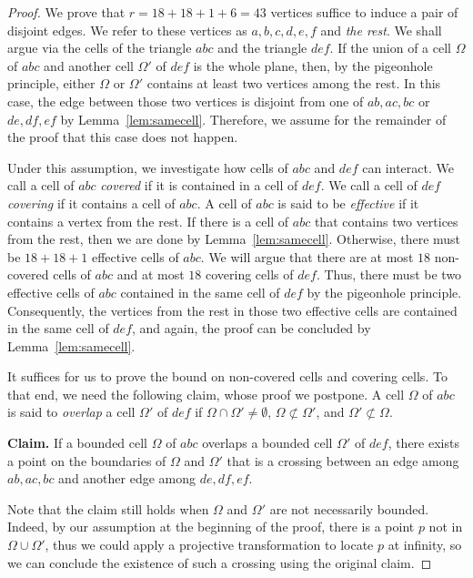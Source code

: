 \documentclass[a4paper,UKenglish,cleveref, autoref, thm-restate]{lipics_arxiv}
\begin{document}
\begin{proof}
We prove that $r = 18 + 18 + 1 + 6 = 43$ vertices suffice to induce a pair of disjoint edges. We refer to these vertices as $a,b,c,d,e,f$ and \textit{the rest}. We shall argue via the cells of the triangle $abc$ and the triangle $def$. If the union of a cell $\Omega$ of $abc$ and another cell $\Omega'$ of $def$ is the whole plane, then, by the pigeonhole principle, either $\Omega$ or $\Omega'$ contains at least two vertices among the rest. In this case, the edge between those two vertices is disjoint from one of $ab,ac,bc$ or $de,df,ef$ by Lemma~\ref{lem:samecell}. Therefore, we assume for the remainder of the proof that this case does not happen.

Under this assumption, we investigate how cells of $abc$ and $def$ can interact. We call a cell of $abc$ \textit{covered} if it is contained in a cell of $def$. We call a cell of $def$ \textit{covering} if it contains a cell of $abc$. A cell of $abc$ is said to be \textit{effective} if it contains a vertex from the rest. If there is a cell of $abc$ that contains two vertices from the rest, then we are done by Lemma~\ref{lem:samecell}. Otherwise, there must be $18+18+1$ effective cells of $abc$. We will argue that there are at most $18$ non-covered cells of $abc$ and at most $18$ covering cells of $def$. Thus, there must be two effective cells of $abc$ contained in the same cell of $def$ by the pigeonhole principle. Consequently, the vertices from the rest in those two effective cells are contained in the same cell of $def$, and again, the proof can be concluded by Lemma~\ref{lem:samecell}.

It suffices for us to prove the bound on non-covered cells and covering cells. To that end, we need the following claim, whose proof we postpone. A cell $\Omega$ of $abc$ is said to \textit{overlap} a cell $\Omega'$ of $def$ if $\Omega \cap \Omega' \neq \emptyset$, $\Omega \not \subset \Omega'$, and $\Omega' \not \subset \Omega$.

\noindent \textbf{Claim.} If a bounded cell $\Omega$ of $abc$ overlaps a bounded cell $\Omega'$ of $def$, there exists a point on the boundaries of $\Omega$ and $\Omega'$ that is a crossing between an edge among $ab,ac,bc$ and another edge among $de,df,ef$.

Note that the claim still holds when $\Omega$ and $\Omega'$ are not necessarily bounded. Indeed, by our assumption at the beginning of the proof, there is a point $p$ not in $\Omega \cup \Omega'$, thus we could apply a projective transformation to locate $p$ at infinity, so we can conclude the existence of such a crossing using the original claim.


\end{proof}
\end{document}
